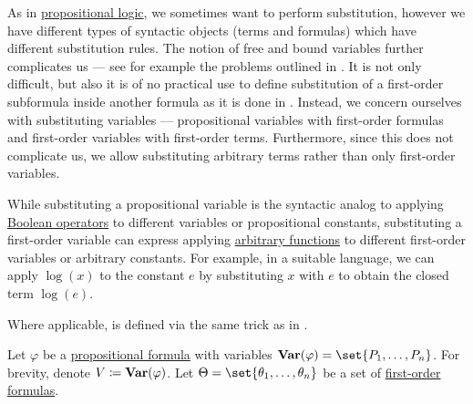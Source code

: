 \begin{definition}\label{def:first_order_substitution}
  As in \hyperref[subsec:propositional_logic]{propositional logic}, we sometimes want to perform substitution, however we have different types of syntactic objects (terms and formulas) which have different substitution rules. The notion of free and bound variables further complicates us --- see for example the problems outlined in . It is not only difficult, but also it is of no practical use to define substitution of a first-order subformula inside another formula as it is done in . Instead, we concern ourselves with substituting variables --- propositional variables with first-order formulas and first-order variables with first-order terms. Furthermore, since this does not complicate us, we allow substituting arbitrary terms rather than only first-order variables.

  While substituting a propositional variable is the syntactic analog to applying \hyperref[def:boolean_operator]{Boolean operators} to different variables or propositional constants, substituting a first-order variable can express applying \hyperref[def:function]{arbitrary functions} to different first-order variables or arbitrary constants. For example, in a suitable language, we can apply \( \log(x) \) to the constant \( e \) by substituting \( x \) with \( e \) to obtain the closed term \( \log(e) \).

  Where applicable,  is defined via the same trick as in .

  \begin{thmenum}
     Let \( \varphi \) be a \hyperref[def:propositional_syntax/formula]{propositional formula} with variables \( \boldop{Var}(\varphi) = \set{ P_1, \ldots, P_n } \). For brevity, denote \( V \coloneqq \operatorname{\mathbf{Var}}(\varphi) \). Let \( \Theta = \set{ \theta_1, \ldots, \theta_n } \) be a set of \hyperref[def:first_order_syntax/formula]{first-order formulas}.


\end{thmenum}
\end{definition}
